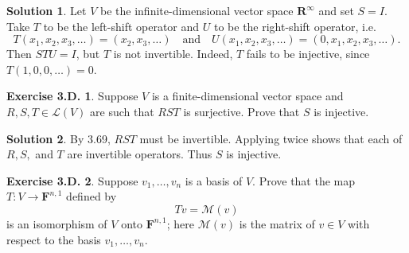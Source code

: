 \documentclass[12pt]{article}
\theoremstyle{definition}
\theoremstyle{exercise}
\newtheorem{exercise}{Exercise 3.D.}
\theoremstyle{solution}
\newtheorem*{solution}{Solution}
\newcommand{\lmap}{\mathcal{L}}
\newcommand{\mat}{\mathcal{M}}
\newcommand{\quand}{\quad \text{and} \quad}
\newcommand{\R}{\mathbf{R}}
\newcommand{\F}{\mathbf{F}}
\begin{document}
\begin{solution}
    Let \( V \) be the infinite-dimensional vector space \( \R^{\infty} \) and set \( S = I \). Take \( T \) to be the left-shift operator and \( U \) to be the right-shift operator, i.e.\
    \[
        T(x_1, x_2, x_3, \ldots) = (x_2, x_3, \ldots) \quand U(x_1, x_2, x_3, \ldots) = (0, x_1, x_2, x_3, \ldots).
    \]
    Then \( STU = I \), but \( T \) is not invertible. Indeed, \( T \) fails to be injective, since \( T(1, 0, 0, \ldots) = 0 \).
\end{solution}

\begin{exercise}
\label{ex:13}
    Suppose \( V \) is a finite-dimensional vector space and \( R, S, T \in \lmap(V) \) are such that \( RST \) is surjective. Prove that \( S \) is injective.
\end{exercise}

\begin{solution}
    By 3.69, \( RST \) must be invertible. Applying  twice shows that each of \( R, S, \) and \( T \) are invertible operators. Thus \( S \) is injective.
\end{solution}

\begin{exercise}
\label{ex:14}
    Suppose \( v_1, \ldots, v_n \) is a basis of \( V \). Prove that the map \( T : V \to \F^{n,1} \) defined by
    \[
        Tv = \mat(v)
    \]
    is an isomorphism of \( V \) onto \( \F^{n,1} \); here \( \mat(v) \) is the matrix of \( v \in V \) with respect to the basis \( v_1, \ldots, v_n \).
\end{exercise}
\end{document}
